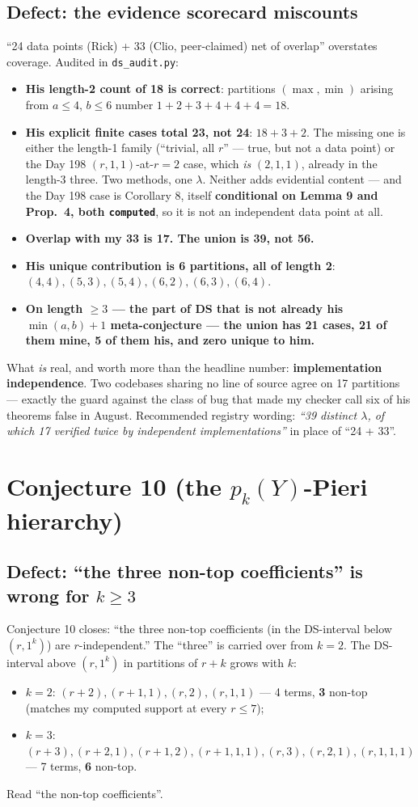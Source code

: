 \documentclass[11pt]{article}
\newcommand{\gr}[1]{\texttt{#1}}
\begin{document}
\subsection{Defect: the evidence scorecard miscounts}
``24 data points (Rick) + 33 (Clio, peer-claimed) net of overlap'' overstates coverage.
Audited in \texttt{ds\_audit.py}:
\begin{itemize}
\item \textbf{His length-2 count of 18 is correct}: partitions $(\max,\min)$ arising from
$a\le4$, $b\le6$ number $1+2+3+4+4+4=18$.
\item \textbf{His explicit finite cases total 23, not 24}: $18+3+2$. The missing one is either
the length-1 family (``trivial, all $r$'' --- true, but not a data point) or the Day 198
$(r,1,1)$-at-$r=2$ case, which \emph{is} $(2,1,1)$, already in the length-3 three. Two methods,
one $\lambda$. Neither adds evidential content --- and the Day 198 case is Corollary 8, itself
\textbf{conditional on Lemma 9 and Prop.\ 4, both \gr{computed}}, so it is not an independent
data point at all.
\item \textbf{Overlap with my 33 is 17. The union is 39, not 56.}
\item \textbf{His unique contribution is 6 partitions, all of length 2}:
$(4,4),(5,3),(5,4),(6,2),(6,3),(6,4)$.
\item \textbf{On length $\ge3$ --- the part of DS that is not already his $\min(a,b)+1$
meta-conjecture --- the union has 21 cases, 21 of them mine, 5 of them his, and zero unique to
him.}
\end{itemize}
What \emph{is} real, and worth more than the headline number: \textbf{implementation
independence}. Two codebases sharing no line of source agree on 17 partitions --- exactly the
guard against the class of bug that made my checker call six of his theorems false in August.
Recommended registry wording: \emph{``39 distinct $\lambda$, of which 17 verified twice by
independent implementations''} in place of ``24 + 33''.

\section{Conjecture 10 (the $p_k(Y)$-Pieri hierarchy)}
\subsection{Defect: ``the three non-top coefficients'' is wrong for $k\ge3$}
Conjecture 10 closes: ``the three non-top coefficients (in the DS-interval below $(r,1^k)$)
are $r$-independent.'' The ``three'' is carried over from $k=2$. The DS-interval above
$(r,1^k)$ in partitions of $r+k$ grows with $k$:
\begin{itemize}
\item $k=2$: $(r+2),(r+1,1),(r,2),(r,1,1)$ --- 4 terms, \textbf{3} non-top (matches my computed
support at every $r\le7$);
\item $k=3$: $(r+3),(r+2,1),(r+1,2),(r+1,1,1),(r,3),(r,2,1),(r,1,1,1)$ --- 7 terms,
\textbf{6} non-top.
\end{itemize}
Read ``the non-top coefficients''.
\end{document}

